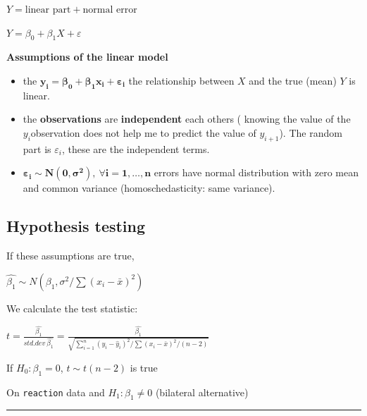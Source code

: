 \documentclass[]{article}
\newenvironment{Shaded}{\begin{snugshade}}{\end{snugshade}}
\newcommand{\DataTypeTok}[1]{\textcolor[rgb]{0.13,0.29,0.53}{#1}}
\newcommand{\KeywordTok}[1]{\textcolor[rgb]{0.13,0.29,0.53}{\textbf{#1}}}
\newcommand{\NormalTok}[1]{#1}
\newcommand{\OperatorTok}[1]{\textcolor[rgb]{0.81,0.36,0.00}{\textbf{#1}}}
\newcommand{\StringTok}[1]{\textcolor[rgb]{0.31,0.60,0.02}{#1}}
\providecommand{\tightlist}{%
  \setlength{\itemsep}{0pt}\setlength{\parskip}{0pt}}
\begin{document}
\(Y=\textrm{linear part} + \textrm{normal error}\)

\(Y=\beta_0 + \beta_1 X + \varepsilon\)

\textbf{Assumptions of the linear model }

\begin{itemize}
\tightlist
\item
  the \(\boldsymbol{y_i=\beta_0 + \beta_1 x_i + \varepsilon_i}\) the
  relationship between \(X\) and the true (mean) \(Y\) is linear.
\item
  the \textbf{observations } are \textbf{independent} each others (
  knowing the value of the \(y_i\)observation does not help me to
  predict the value of \(y_{i + 1}\)). The random part is
  \(\varepsilon_i\), these are the independent terms.
\item
  \(\boldsymbol{\varepsilon_i \sim N (0, \sigma ^ 2), \ \forall i=1, \ldots, n}\)
  errors have normal distribution with zero mean and common variance
  (homoschedasticity: same variance).
\end{itemize}

\hypertarget{hypothesis-testing}{%
\subsection{Hypothesis testing}\label{hypothesis-testing}}

If these assumptions are true,

\(\hat{\beta_1} \sim N (\beta_1, \sigma ^ 2 / \sum (x_i- \bar{x}) ^ 2)\)

We calculate the test statistic:

\(t=\frac{\hat{\beta_1}}{std.dev\ \hat{\beta_1}}=\frac{\hat{\beta_1}}{\sqrt{\sum_{i=1} ^ n (y_i- \hat{y}_i) ^ 2 / \sum (x_i- \bar{x}) ^ 2 / (n-2)}}\)

If \(H_0: \beta_1=0\), \(t \sim t (n-2)\) is true

On \texttt{reaction} data and \(H_1: \beta_1 \neq 0\) (bilateral
alternative)

\begin{center}\rule{0.5\linewidth}{\linethickness}\end{center}

\begin{Shaded}
\end{Shaded}
\end{document}
